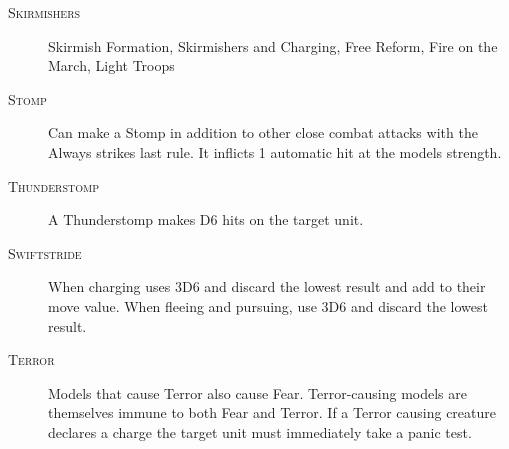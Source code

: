 \begin{description}
\item[\textsc{Skirmishers}]\label{rule:skirmish} Skirmish Formation, Skirmishers and Charging, Free Reform, Fire on the March, Light Troops 
\item[\textsc{Stomp}]\label{rule:stomp} Can make a Stomp in addition to other close combat attacks with the Always strikes last rule. It inflicts 1 automatic hit at the models strength.
\item[\textsc{Thunderstomp}]\label{rule:thunderstomp} A Thunderstomp makes D6 hits on the target unit.
\item[\textsc{Swiftstride}]\label{rule:swiftstride} When charging uses 3D6 and discard the lowest result and add to their move value. When fleeing and pursuing, use 3D6 and discard the lowest result.
\item[\textsc{Terror}]\label{rule:terror} Models that cause Terror also cause Fear. Terror-causing models are themselves immune to both Fear and Terror. If a Terror causing creature declares a charge the target unit must immediately take a panic test. 
\end{description}
